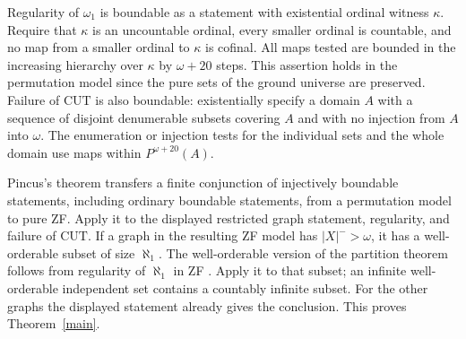 \documentclass[11pt]{article}
\begin{document}
Regularity of $\omega_1$ is boundable as a statement with existential ordinal witness $\kappa$. Require that $\kappa$ is an uncountable ordinal, every smaller ordinal is countable, and no map from a smaller ordinal to $\kappa$ is cofinal. All maps tested are bounded in the increasing hierarchy over $\kappa$ by $\omega+20$ steps. This assertion holds in the permutation model since the pure sets of the ground universe are preserved. Failure of $\mathrm{CUT}$ is also boundable: existentially specify a domain $A$ with a sequence of disjoint denumerable subsets covering $A$ and with no injection from $A$ into $\omega$. The enumeration or injection tests for the individual sets and the whole domain use maps within $P^{\omega+20}(A)$.

Pincus's theorem \cite[Theorem~3A3]{pincus} transfers a finite conjunction of injectively boundable statements, including ordinary boundable statements, from a permutation model to pure ZF. Apply it to the displayed restricted graph statement, regularity, and failure of $\mathrm{CUT}$. If a graph in the resulting ZF model has $|X|^->\omega$, it has a well-orderable subset of size $\aleph_1$. The well-orderable version of the partition theorem follows from regularity of $\aleph_1$ in ZF \cite[Proposition~3.3(1)]{bg}. Apply it to that subset; an infinite well-orderable independent set contains a countably infinite subset. For the other graphs the displayed statement already gives the conclusion. This proves Theorem~\ref{main}.
\end{document}
